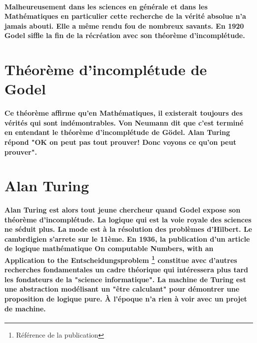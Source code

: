 \documentclass[a4paper, 11pt]{book}
\begin{document}
\paragraph{
  Malheureusement dans les sciences en générale et dans les Mathématiques en particulier cette recherche de la vérité absolue n'a jamais abouti. Elle a même rendu fou de nombreux savants. En 1920 Godel siffle la fin de la récréation avec son théorème d'incomplétude.
}

\section*{ Théorème d'incomplétude de Godel }

\paragraph{
  Ce théorème affirme qu'en Mathématiques, il existerait toujours des vérités qui sont indémontrables. Von Neumann dit que c'est terminé en entendant le théorème d'incomplétude de Gödel. Alan Turing répond "OK on peut pas tout prouver! Donc voyons ce qu'on peut prouver".
}

\section*{ Alan Turing }

\paragraph{Alan Turing est alors tout jeune chercheur quand Godel expose son théorème d'incomplétude. La logique qui est la voie royale des sciences ne séduit plus. La mode est à la résolution des problèmes d'Hilbert. Le cambrdigien s'arrete sur le 11ème. En 1936, la publication d'un article de logique mathématique On computable Numbers, with an Application to the Entscheidungsproblem \footnote{Référence de la publication} constitue avec d'autres recherches fondamentales un cadre théorique qui intéressera plus tard les fondateurs de la "science informatique". La machine de Turing est une abstraction modélisant un "être calculant" pour démontrer une proposition de logique pure. À l'époque n'a rien à voir avec un projet de machine.}

\end{document}
